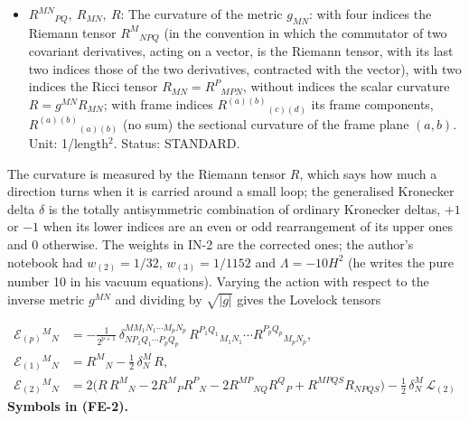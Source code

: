 \documentclass[
  10pt,
]{article}
\begin{document}
\begin{itemize}
  \(Q\): A coordinate index of eight dimensions (also
  \(Q_1, Q_2, \dots\)), running over \(x_0, \dots, x_7\); a repeated
  index is summed. Status: STANDARD.
\item
  \(R^{MN}{}_{PQ},\ R_{MN},\ R\): The curvature of the metric
  \(g_{MN}\): with four indices the Riemann tensor \(R^M{}_{NPQ}\) (in
  the convention in which the commutator of two covariant derivatives,
  acting on a vector, is the Riemann tensor, with its last two indices
  those of the two derivatives, contracted with the vector), with two
  indices the Ricci tensor \(R_{MN} = R^P{}_{MPN}\), without indices the
  scalar curvature \(R = g^{MN}R_{MN}\); with frame indices
  \(R^{(a)(b)}{}_{(c)(d)}\) its frame components,
  \(R^{(a)(b)}{}_{(a)(b)}\) (no sum) the sectional curvature of the
  frame plane \((a, b)\). Unit: 1/length\(^2\). Status: STANDARD.
\end{itemize}

The curvature is measured by the Riemann tensor \(R\), which says how
much a direction turns when it is carried around a small loop; the
generalised Kronecker delta \(\delta\) is the totally antisymmetric
combination of ordinary Kronecker deltas, \(+1\) or \(-1\) when its
lower indices are an even or odd rearrangement of its upper ones and 0
otherwise. The weights in IN-2 are the corrected ones; the author's
notebook had \(w_{(2)} = 1/32\), \(w_{(3)} = 1/1152\) and
\(\Lambda = -10H^2\) (he writes the pure number 10 in his vacuum
equations). Varying the action with respect to the inverse metric
\(g^{MN}\) and dividing by \(\sqrt{\lvert g\rvert}\) gives the Lovelock
tensors

\[
\begin{aligned}
\mathcal{E}_{(p)}{}^M{}_N &= -\frac{1}{2^{p+1}}\,\delta^{MM_1N_1\cdots M_pN_p}_{NP_1Q_1\cdots P_pQ_p}\,
 R^{P_1Q_1}{}_{M_1N_1}\cdots R^{P_pQ_p}{}_{M_pN_p},\\
\mathcal{E}_{(1)}{}^M{}_N &= R^M{}_N - \frac12\,\delta^M_N\,R,\\
\mathcal{E}_{(2)}{}^M{}_N &= 2\big(R\,R^M{}_N - 2R^M{}_PR^P{}_N - 2R^{MP}{}_{NQ}R^Q{}_P + R^{MPQS}R_{NPQS}\big)
 - \frac12\,\delta^M_N\,\mathcal{L}_{(2)}
\end{aligned} \tag{FE-2}
\] \textbf{Symbols in (FE-2).}
\end{document}
